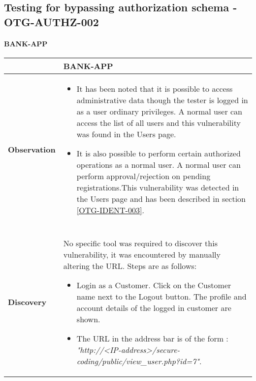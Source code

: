 \subsection{Testing for bypassing authorization schema - OTG-AUTHZ-002} \label{OTG-AUTHZ-002}

\paragraph{BANK-APP} \mbox{}
\begin{longtable*}{p{.20\textwidth} | p{.80\textwidth}}
    \hline
    & \textbf{BANK-APP} \\
    \hline
    \textbf{Observation} &
   \begin {itemize}
   	\item It has been noted that it is possible to access administrative data though the tester is logged in as a user ordinary privileges. A normal user can access the list of all users and this vulnerability was found in the Users page.

   \item It is also possible to perform certain authorized operations as a normal user. A normal user can perform approval/rejection on pending registrations.This vulnerability was detected in the Users page and has been described in section \ref{OTG-IDENT-003}.

   \end{itemize}
    \\\\
    \textbf{Discovery} &
       No specific tool was required to discover this vulnerability, it was encountered by manually altering the URL. Steps are as follows:
          \begin{itemize}
      	    \item Login as a Customer. Click on the Customer name next to the Logout button. The profile and account details of the logged in customer are shown.

      	    \item The URL in the address bar is of the form : \textit{"http://<IP-address>/secure-coding/public/view\_user.php?id=7"}.


\end{itemize}
\end{longtable*}
